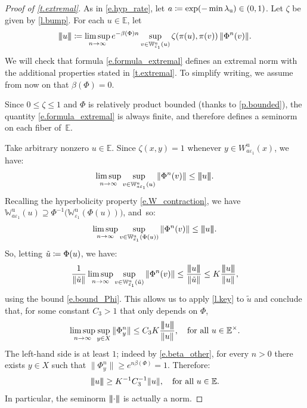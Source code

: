 \documentclass[JEP,XML,SOM,Unicode]{cedram}
\def\vcentcolon{\mathrel{\mathop\ordinarycolon}}
\providecommand\ordinarycolon{:}
\providecommand*\coloneqq{\vcentcolon\mathrel{\mkern-1.2mu}=}
\theoremstyle{plain}
\theoremstyle{definition}
\newcommand{\tribar}[1]{\mathopen{| {\kern -1.5pt} | {\kern -1.5pt} |} {#1}
\mathclose{| {\kern -1.5pt} | {\kern -1.5pt} |}}
\newcommand{\EE}{\mathbb{E}}
\newcommand{\WW}{\mathbb{W}}
\newcommand{\uu}{\mathrm{u}}
\let\epsilon\varepsilon
\begin{document}
\begin{proof}[Proof of \cref{t.extremal}]
As in \eqref{e.hyp_rate}, let $a \coloneqq \exp(-\min \lambda_\uu) \in (0,1)$.
Let $\zeta$ be given by \cref{l.bump}.
For each $u \in \EE$, let
\begin{equation}\label{e.formula_extremal}
\tribar{u} \coloneqq \limsup_{n \to \infty} e^{-\beta(\Phi) n} \sup_{v \in \WW^\uu_{\epsilon_1}(u)} \zeta(\pi(u),\pi(v)) \, \| \Phi^n (v) \|.
\end{equation}
We will check that formula \eqref{e.formula_extremal} defines an extremal norm with the additional properties stated in \cref{t.extremal}.
To simplify writing, we assume from now on that $\beta(\Phi) = 0$.

Since $0 \le \zeta \le 1$ and $\Phi$ is relatively product bounded (thanks to \cref{p.bounded}), the quantity \eqref{e.formula_extremal} is always finite, and therefore defines a seminorm on each fiber of~$\EE$.

Take arbitrary nonzero $u \in \EE$.
Since $\zeta(x,y) = 1$ whenever $y \in W^\uu_{a \epsilon_1}(x)$, we have:
\[
\limsup_{n \to \infty} \sup_{v \in \WW^\uu_{a\epsilon_1}(u)} \| \Phi^n (v) \| \le \tribar{u}.
\]
Recalling the hyperbolicity property \eqref{e.W_contraction}, we have $\WW^\uu_{a \epsilon_1}(u)\!\supseteq\!\Phi^{-1}\big(\WW^\uu_{\epsilon_1}(\Phi(u))\big)$, and~so:
\begin{equation}\label{e.nice1}
\limsup_{n \to \infty} \sup_{v \in \WW^\uu_{\epsilon_1}(\Phi(u))} \| \Phi^n (v) \| \le \tribar{u}.
\end{equation}
So, letting $\tilde u \coloneqq \Phi(u)$, we have:
\[
\frac{1}{\|\tilde u\|}
\limsup_{n \to \infty} \sup_{v \in \WW^\uu_{\epsilon_1}(\tilde u)} \| \Phi^n (v) \| \le \frac{\tribar{u}}{\|\tilde u\|} \le K \frac{\tribar{u}}{\|u\|},
\]
using the bound \eqref{e.bound_Phi}.
This allows us to apply \cref{l.key} to $\tilde u$ and conclude that, for some constant $C_3>1$ that only depends on $\Phi$,
\begin{equation}\label{e.nice2}
\limsup_{n \to \infty} \sup_{y \in X} \|\Phi^n_y \| \le C_3 K \frac{\tribar{u}}{\|u\|}, \quad\text{for all } u \in \EE^\times.
\end{equation}
The left-hand side is at least $1$; indeed by \eqref{e.beta_other}, for every $n>0$ there exists $y \in X$ such that $\|\Phi^n_y \| \ge e^{n\beta(\Phi)} = 1$.
Therefore:
\begin{equation}\label{e.comparison_below}
\tribar{u} \ge K^{-1} C_3^{-1} \|u\|, \quad\text{for all } u \in \EE.
\end{equation}
In particular, the seminorm $\tribar{\mathord{\cdot}}$ is actually a norm.


\end{proof}
\end{document}
